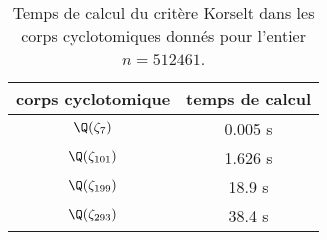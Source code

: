 \begin{table}[H]
	\begin{center}
		\begin{tabular}{|c|c|}
			\hline
			corps cyclotomique & temps de calcul \\
			\hline
			\hline
			$\Q(\zeta_7)$ & 0.005 s \\\hline
			$\Q(\zeta_{101})$ & 1.626 s \\\hline
			$\Q(\zeta_{199})$ & 18.9 s \\\hline
			$\Q(\zeta_{293})$ & 38.4 s \\\hline
		\end{tabular}
		\caption{Temps de calcul du critère Korselt dans les corps cyclotomiques donnés pour l'entier $n=512461$.}
	\end{center}
\end{table}
